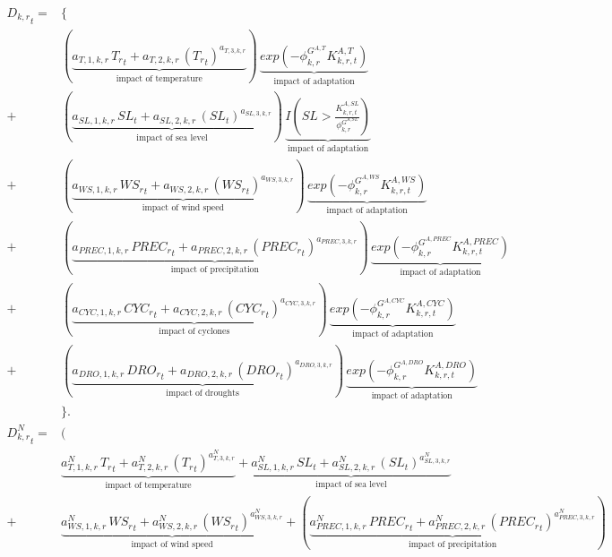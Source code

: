 \documentclass[10pt,a4paper]{article}
\begin{document}
\begin{align}
{{D_{k,r}}_{t}}=& \Big\lbrace \nonumber \\
& (\underbrace{{{a_{T,1,k,r}}} \, {{T_{r}}_{t}}+{{a_{T,2,k,r}}}\, \left({T_{r}}_{t}\right)^{a_{T,3,k,r}}}_{\mbox{impact of temperature}})  \, \underbrace{exp(-\phi^{G^{A,T}}_{k,r} K^{A,T}_{k,r,t})}_{\mbox{impact of adaptation}} \,  \nonumber \\
+ & (\underbrace{{{a_{SL,1,k,r}}}\, {{SL}_{t}}+{{a_{SL,2,k,r}}}\, \left({SL}_{t}\right)^{{{a_{SL,3,k,r}}}}}_{\mbox{impact of sea level}})   \, \underbrace{I(SL > \frac{K^{A,SL}_{k,r,t}}{\phi^{G^{A,SL}}_{k,r}})}_{\mbox{impact of adaptation}} \nonumber \\
+ & (\underbrace{{{a_{WS,1,k,r}}}\, {{WS_{r}}_{t}}+{{a_{WS,2,k,r}}}\, \left({WS_{r}}_{t}\right)^{{{a_{WS,3,k,r}}}}}_{\mbox{impact of wind speed}}) \, \underbrace{exp(-\phi^{G^{A,WS}}_{k,r} K^{A,WS}_{k,r,t})}_{\mbox{impact of adaptation}} \nonumber \\
+ & (\underbrace{{{a_{PREC,1,k,r}}} \, {{PREC_{r}}_{t}}+{{a_{PREC,2,k,r}}}\, \left({PREC_{r}}_{t}\right)^{{{a_{PREC,3,k,r}}}}}_{\mbox{impact of precipitation}}) \, \underbrace{exp(-\phi^{G^{A,PREC}}_{k,r} K^{A,PREC}_{k,r,t})}_{\mbox{impact of adaptation}} \nonumber \\
+ & (\underbrace{{{a_{CYC,1,k,r}}}\, {{CYC_{r}}_{t}}+{{a_{CYC,2,k,r}}}\, \left({CYC_{r}}_{t}\right)^{{{a_{CYC,3,k,r}}}}}_{\mbox{impact of cyclones}}) \, \underbrace{exp(-\phi^{G^{A,CYC}}_{k,r} K^{A,CYC}_{k,r,t})}_{\mbox{impact of adaptation}}  \nonumber \\ 
+ & (\underbrace{{{a_{DRO,1,k,r}}} \, {{DRO_{r}}_{t}}+{{a_{DRO,2,k,r}}}\, \left({DRO_{r}}_{t}\right)^{{{a_{DRO,3,k,r}}}}}_{\mbox{impact of droughts}}) \, \underbrace{exp(-\phi^{G^{A,DRO}}_{k,r} K^{A,DRO}_{k,r,t})}_{\mbox{impact of adaptation}}  \nonumber \\
&\Big\rbrace. \label{eq:Damages} \\
{{D^{N}_{k,r}}_{t}}=& \Big( \nonumber \\
&\underbrace{{{a^{N}_{T,1,k,r}}} \, {{T_{r}}_{t}}+{{a^{N}_{T,2,k,r}}}\, \left({T_{r}}_{t}\right)^{a^{N}_{T,3,k,r}}}_{\mbox{impact of temperature}} + 
\underbrace{{{a^{N}_{SL,1,k,r}}}\, {{SL}_{t}}+{{a^{N}_{SL,2,k,r}}}\, \left({SL}_{t}\right)^{{{a^{N}_{SL,3,k,r}}}}}_{\mbox{impact of sea level}} \nonumber \\
+ & \underbrace{{{a^{N}_{WS,1,k,r}}}\, {{WS_{r}}_{t}}+{{a^{N}_{WS,2,k,r}}}\, \left({WS_{r}}_{t}\right)^{{{a^{N}_{WS,3,k,r}}}}}_{\mbox{impact of wind speed}} 
+ (\underbrace{{{a^{N}_{PREC,1,k,r}}} \, {{PREC_{r}}_{t}}+{{a^{N}_{PREC,2,k,r}}}\, \left({PREC_{r}}_{t}\right)^{{{a^{N}_{PREC,3,k,r}}}}}_{\mbox{impact of precipitation}}) \,  \nonumber \\

\end{align}
\end{document}
